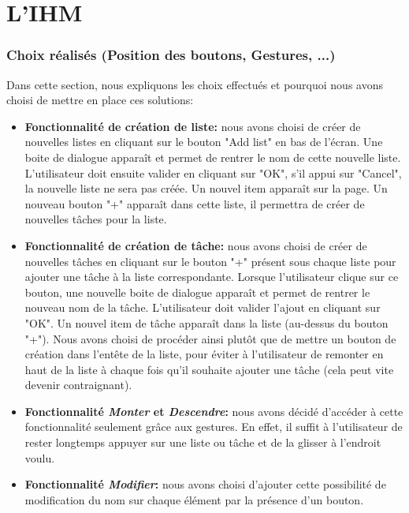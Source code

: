 \documentclass[a4paper,10pt]{article}
\begin{document}
\newpage
\section{L'IHM}

\subsubsection{Choix réalisés (Position des boutons, Gestures, ...)}
Dans cette section, nous expliquons les choix effectués et pourquoi nous avons choisi de mettre en place ces solutions:

\begin{itemize}
\item \textbf{Fonctionnalité de création de liste:} nous avons choisi de créer de nouvelles listes en cliquant sur le bouton "Add list" en bas de l'écran.
Une boite de dialogue apparaît et permet de rentrer le nom de cette nouvelle liste. L'utilisateur doit ensuite valider en cliquant sur "OK", s'il appui sur "Cancel", la nouvelle liste ne sera pas créée. Un nouvel item apparaît sur la page. Un nouveau bouton "+" apparaît dans cette liste, il permettra de créer de nouvelles tâches pour la liste.
\item \textbf{Fonctionnalité de création de tâche:} nous avons choisi de créer de nouvelles tâches en cliquant sur le bouton "+" présent sous chaque liste pour ajouter une tâche à la liste correspondante. Lorsque l'utilisateur clique sur ce bouton, une nouvelle boite de dialogue apparaît et permet de rentrer le nouveau nom de la tâche. L'utilisateur doit valider l'ajout en cliquant sur "OK". Un nouvel item de tâche apparaît dans la liste (au-dessus du bouton "+"). Nous avons choisi de procéder ainsi plutôt que de mettre un bouton de création dans l'entête de la liste, pour éviter à l'utilisateur de remonter en haut de la liste à chaque fois qu'il souhaite ajouter une tâche (cela peut vite devenir contraignant).
\item \textbf{Fonctionnalité \textit{Monter} et \textit{Descendre}:} nous avons décidé d'accéder à cette fonctionnalité seulement grâce aux gestures. En effet, il suffit à l'utilisateur de rester longtemps appuyer sur une liste ou tâche et de la glisser à l'endroit voulu.
\item \textbf{Fonctionnalité \textit{Modifier}:} nous avons choisi d'ajouter cette possibilité de modification du nom sur chaque élément par la présence d'un bouton.

\end{itemize}
\end{document}
